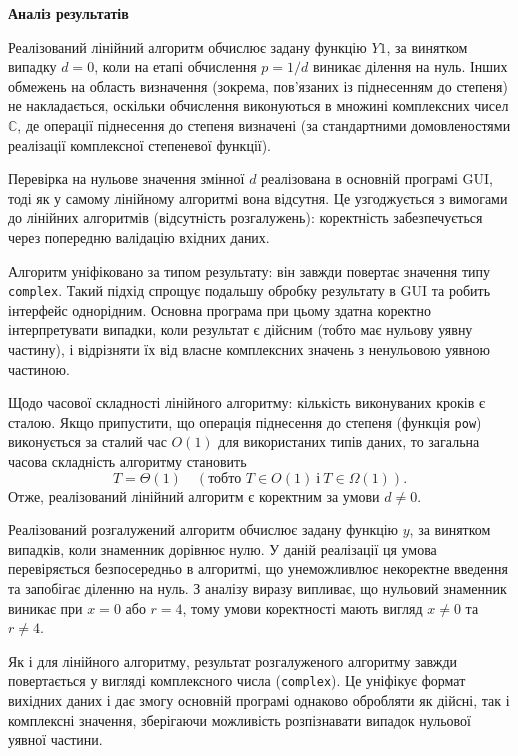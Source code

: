 \documentclass[12pt,a4paper]{article}
\begin{document}
    \begin{center} \textbf{\large Аналіз результатів} \end{center}

    Реалізований лінійний алгоритм обчислює задану функцію $Y1$, за винятком випадку $d = 0$, коли на етапі обчислення $p=1 / d$ виникає ділення на нуль. Інших обмежень на область визначення (зокрема, пов’язаних із піднесенням до степеня) не накладається, оскільки обчислення виконуються в множині комплексних чисел $\mathbb{C}$, де операції піднесення до степеня визначені (за стандартними домовленостями реалізації комплексної степеневої функції).

    Перевірка на нульове значення змінної $d$ реалізована в основній програмі GUI, тоді як у самому лінійному алгоритмі вона відсутня. Це узгоджується з вимогами до лінійних алгоритмів (відсутність розгалужень): коректність забезпечується через попередню валідацію вхідних даних.
    
    Алгоритм уніфіковано за типом результату: він завжди повертає значення типу \texttt{complex}. Такий підхід спрощує подальшу обробку результату в GUI та робить інтерфейс однорідним. Основна програма при цьому здатна коректно інтерпретувати випадки, коли результат є дійсним (тобто має нульову уявну частину), і відрізняти їх від власне комплексних значень з ненульовою уявною частиною.

    Щодо часової складності лінійного алгоритму: кількість виконуваних кроків є сталою. Якщо припустити, що операція піднесення до степеня (функція \texttt{pow}) виконується за сталий час $O(1)$ для використаних типів даних, то загальна часова складність алгоритму становить
    \[
    T=\Theta(1)\quad (\text{тобто } T\in O(1)\ \text{і}\ T\in \Omega(1)).
    \]
    Отже, реалізований лінійний алгоритм є коректним за умови $d\neq 0$.

    Реалізований розгалужений алгоритм обчислює задану функцію $y$, за винятком випадків, коли знаменник дорівнює нулю. У даній реалізації ця умова перевіряється безпосередньо в алгоритмі, що унеможливлює некоректне введення та запобігає діленню на нуль. З аналізу виразу випливає, що нульовий знаменник виникає при $x=0$ або $r=4$, тому умови коректності мають вигляд $x\neq 0$ та $r\neq 4$.

    Як і для лінійного алгоритму, результат розгалуженого алгоритму завжди повертається у вигляді комплексного числа (\texttt{complex}). Це уніфікує формат вихідних даних і дає змогу основній програмі однаково обробляти як дійсні, так і комплексні значення, зберігаючи можливість розпізнавати випадок нульової уявної частини.
\end{document}
